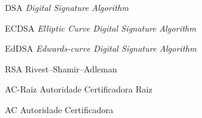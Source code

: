 \begin{siglas}
  \item[DSA] \textit{Digital Signature Algorithm}
  \item[ECDSA] \textit{Elliptic Curve Digital Signature Algorithm}
  \item[EdDSA] \textit{Edwards-curve Digital Signature Algorithm}
  \item[RSA] Rivest–Shamir–Adleman
  \item[AC-Raiz] Autoridade Certificadora Raiz
  \item[AC] Autoridade Certificadora
\end{siglas}
